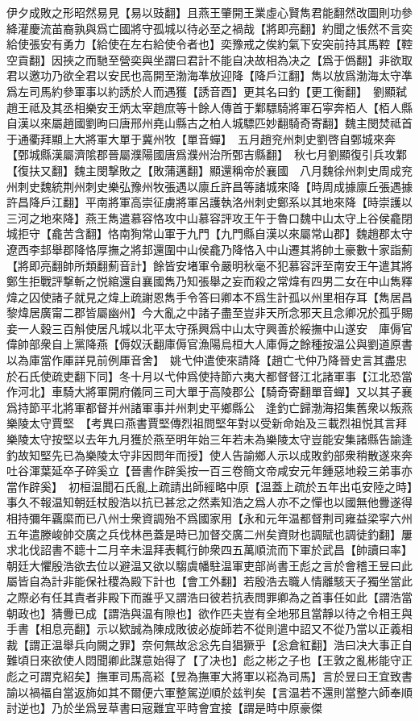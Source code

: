 伊夕成敗之形昭然易見【易以豉翻】且燕王肇開王業虛心賢雋君能翻然改圖則功參絳灌慶流苖裔孰與爲亡國將守孤城以待必至之禍哉【將即亮翻】約聞之悵然不言奕給使張安有勇力【給使在左右給使令者也】奕豫戒之俟約氣下安突前持其馬鞚【鞚空貢翻】因挾之而馳至營奕與坐謂曰君計不能自决故相為决之【爲于僞翻】非欲取君以邀功乃欲全君以安民也高開至渤海凖放迎降【降戶江翻】雋以放爲渤海太守凖爲左司馬約參軍事以約誘於人而遇獲【誘音酉】更其名曰釣【更工衡翻】　劉顯弑趙王祗及其丞相樂安王炳太宰趙庶等十餘人傳首于鄴驃騎將軍石寜奔栢人【栢人縣自漢以來屬趙國劉昫曰唐邢州堯山縣古之柏人城驃匹妙翻騎奇寄翻】魏主閔焚祗首于通衢拜顯上大將軍大單于冀州牧【單音蟬】　五月趙兖州刺史劉啓自鄄城來奔【鄄城縣漢屬濟隂郡晉屬濮陽國唐爲濮州治所鄄吉縣翻】　秋七月劉顯復引兵攻鄴【復扶又翻】魏主閔撃敗之【敗蒲邁翻】顯還稱帝於襄國　八月魏徐州刺史周成兖州刺史魏統荆州刺史樂弘豫州牧張遇以廪丘許昌等諸城來降【時周成據廪丘張遇據許昌降戶江翻】平南將軍高崇征虜將軍呂護執洛州刺史鄭系以其地來降【時崇護以三河之地來降】燕王雋遣慕容恪攻中山慕容評攻王午于魯口魏中山太守上谷侯龕閉城拒守【龕苦含翻】恪南狥常山軍于九門【九門縣自漢以來屬常山郡】魏趙郡太守遼西李邽舉郡降恪厚撫之將邽還圍中山侯龕乃降恪入中山遷其將帥土豪數十家詣薊【將即亮翻帥所類翻薊音計】餘皆安堵軍令嚴明秋毫不犯慕容評至南安王午遣其將鄭生拒戰評撃斬之悦綰還自襄國雋乃知張舉之妄而殺之常煒有四男二女在中山雋釋煒之囚使諸子就見之煒上疏謝恩雋手令答曰卿本不爲生計孤以州里相存耳【雋居昌黎煒居廣甯二郡皆屬幽州】今大亂之中諸子盡至豈非天所念邪天且念卿况於孤乎賜妾一人穀三百斛使居凡城以北平太守孫興爲中山太守興善於綏撫中山遂安　庫傉官偉帥部衆自上黨降燕【傉奴沃翻庫傉官漁陽烏桓大人庫傉之餘種按温公與劉道原書以為庫當作厙詳見前例厙音舍】　姚弋仲遣使來請降【趙亡弋仲乃降晉史言其盡忠於石氏使疏吏翻下同】冬十月以弋仲爲使持節六夷大都督督江北諸軍事【江北恐當作河北】車騎大將軍開府儀同三司大單于高陵郡公【騎奇寄翻單音蟬】又以其子襄爲持節平北將軍都督并州諸軍事并州刺史平鄉縣公　逢釣亡歸渤海招集舊衆以叛燕樂陵太守賈堅　【考異曰燕書賈堅傳烈祖問堅年對以受新命始及三載烈祖悦其言拜樂陵太守按堅以去年九月獲於燕至明年始三年若未為樂陵太守豈能安集諸縣告諭逢釣故知堅先已為樂陵太守非因問年而授】使人告諭鄉人示以成敗釣部衆稍散遂來奔　吐谷渾葉延卒子碎奚立【晉書作辟奚按一百三卷簡文帝咸安元年鍾惡地殺三弟事亦當作辟奚】　初桓温聞石氏亂上疏請出師經略中原【温蓋上疏於五年出屯安陸之時】事久不報温知朝廷杖殷浩以抗已甚忿之然素知浩之爲人亦不之憚也以國無他釁遂得相持彌年覊縻而已八州士衆資調殆不爲國家用【永和元年温都督荆司雍益梁寜六州五年遣滕峻帥交廣之兵伐林邑蓋是時已加督交廣二州矣資財也調賦也調徒釣翻】屢求北伐詔書不聼十二月辛未温拜表輒行帥衆四五萬順流而下軍於武昌【帥讀曰率】朝廷大懼殷浩欲去位以避温又欲以騶虞幡駐温軍吏部尚書王彪之言於會稽王昱曰此屬皆自為計非能保社稷為殿下計也【會工外翻】若殷浩去職人情離駭天子獨坐當此之際必有任其責者非殿下而誰乎又謂浩曰彼若抗表問罪卿為之首事任如此【謂浩當朝政也】猜釁已成【謂浩與温有隙也】欲作匹夫豈有全地邪且當靜以待之令相王與手書【相息亮翻】示以欵誠為陳成敗彼必旋師若不從則遣中詔又不從乃當以正義相裁【謂正温舉兵向闕之罪】奈何無故忩忩先自猖獗乎【忩倉紅翻】浩曰决大事正自難頃日來欲使人悶聞卿此謀意始得了【了决也】彪之彬之子也【王敦之亂彬能守正彪之可謂克紹矣】撫軍司馬高崧【昱為撫軍大將軍以崧為司馬】言於昱曰王宜致書諭以禍福自當返斾如其不爾便六軍整駕逆順於兹判矣【言温若不還則當整六師奉順討逆也】乃於坐爲昱草書曰宼難宜平時會宜接【謂是時中原豪傑